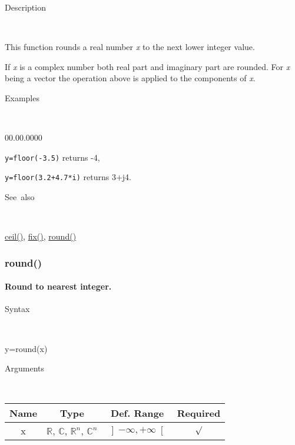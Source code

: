 \begin{description}
\item [Description]~
\end{description}
This function rounds a real number \textit{x} to the next lower integer
value. 

If \textit{x} is a complex number both real part and imaginary part
are rounded. For \textit{x} being a vector the operation above is
applied to the components of \textit{x}.

\begin{description}
\item [Examples]~
\end{description}
\begin{lyxlist}{00.00.0000}
\item [\texttt{y=floor(-3.5)}]returns -4,
\item [\texttt{y=floor(3.2+4.7{*}i)}]returns 3+j4.
\end{lyxlist}
\begin{description}
\item [See~also]~
\end{description}
\textcolor{blue}{\hyperlink{ceil}{ceil()}}\textcolor{black}{,} \textcolor{blue}{\hyperlink{fix}{fix()}}\textcolor{black}{,}
\textcolor{blue}{\hyperlink{round}{round()}}


\newpage
\subsubsection*{\hypertarget{round}{}{\Large round()}}


\paragraph{\label{par:round}Round to nearest integer.}

\begin{description}
\item [Syntax]~
\end{description}
y=round(x)

\begin{description}
\item [Arguments]~
\end{description}
\begin{tabular}{|c|c|c|c|}
\hline 
Name&
Type&
Def. Range&
Required\tabularnewline
\hline
\hline 
x&
$\mathbb{R}$, $\mathbb{C}$, $\mathbb{R}^{n}$, $\mathbb{C}^{n}$&
$\left]-\infty,+\infty\right[$&
$\surd$\tabularnewline
\hline
\end{tabular}

